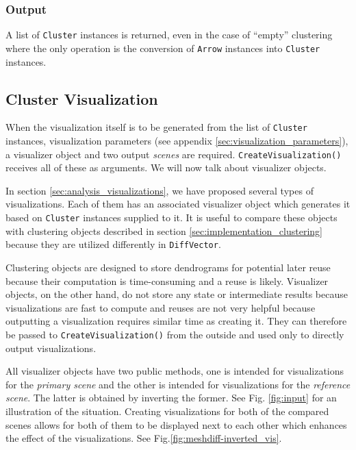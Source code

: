 \subsubsection{Output}

A list of \verb+Cluster+ instances is returned, even in the case of ``empty'' clustering where the only operation is the conversion of \verb+Arrow+ instances into \verb+Cluster+ instances.

\subsection{Cluster Visualization}
\label{sec:implementation_visualizers}

When the visualization itself is to be generated from the list of \verb+Cluster+ instances, visualization parameters (see appendix \ref{sec:visualization_parameters}), a visualizer object and two output {\it scenes} are required. \verb+CreateVisualization()+ receives all of these as arguments. We will now talk about visualizer objects.

In section \ref{sec:analysis_visualizations}, we have proposed several types of visualizations. Each of them has an associated visualizer object which generates it based on \verb+Cluster+ instances supplied to it. It is useful to compare these objects with clustering objects described in section \ref{sec:implementation_clustering} because they are utilized differently in \verb+DiffVector+.

Clustering objects are designed to store dendrograms for potential later reuse because their computation is time-consuming and a reuse is likely. Visualizer objects, on the other hand, do not store any state or intermediate results because visualizations are fast to compute and reuses are not very helpful because outputting a visualization requires similar time as creating it. They can therefore be passed to \verb+CreateVisualization()+ from the outside and used only to directly output visualizations.

All visualizer objects have two public methods, one is intended for visualizations for the {\it primary scene} and the other is intended for visualizations for the {\it reference scene}. The latter is obtained by inverting the former. See Fig. \ref{fig:input} for an illustration of the situation. Creating visualizations for both of the compared scenes allows for both of them to be displayed next to each other which enhances the effect of the visualizations. See Fig.\ref{fig:meshdiff-inverted_vis}.

